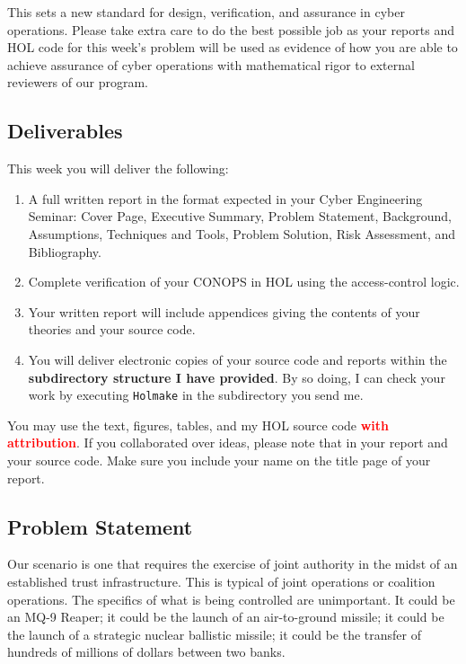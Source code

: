 \documentclass[10pt,twoside]{article}
\newcommand{\redtext}[1]{\textcolor{red}{#1}}
\begin{document}
This sets a new standard for design, verification, and assurance in
cyber operations.  Please take extra care to do the best possible job
as your reports and HOL code for this week's problem will be used as
evidence of how you are able to achieve assurance of cyber operations
with mathematical rigor to external reviewers of our program.

\subsection{Deliverables}
\label{sec:deliverables}

This week you will deliver the following:
\begin{enumerate}
\item A full written report in the format expected in your Cyber
  Engineering Seminar: Cover Page, Executive Summary, Problem
  Statement, Background, Assumptions, Techniques and Tools, Problem
  Solution, Risk Assessment, and Bibliography.
\item Complete verification of your CONOPS in HOL using the
  access-control logic.
\item Your written report will include appendices giving the contents
  of your theories and your source code.
\item You will deliver electronic copies of your source code and
  reports within the \textbf{subdirectory structure I have
    provided}. By so doing, I can check your work by executing
  \texttt{Holmake} in the subdirectory you send me.
\end{enumerate}
You may use the text, figures, tables, and my HOL source code
\textbf{\redtext{with attribution}}. If you collaborated over ideas,
please note that in your report and your source code. Make sure you
include your name on the title page of your report.

\subsection{Problem Statement}
\label{sec:problem}

Our scenario is one that requires the exercise of joint authority in
the midst of an established trust infrastructure.  This is typical of
joint operations or coalition operations.  The specifics of what is
being controlled are unimportant. It could be an MQ-9 Reaper; it could
be the launch of an air-to-ground missile; it could be the launch of a
strategic nuclear ballistic missile; it could be the transfer of
hundreds of millions of dollars between two banks.
\end{document}
